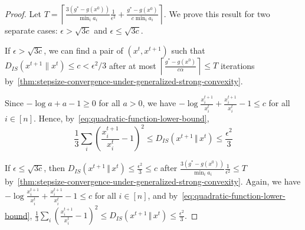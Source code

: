 \documentclass[format=acmsmall,authorversion]{acmart}
\newcommand{\BRC}[1]{{\textcolor{red}{BRC: #1}}}
\begin{document}
\begin{proof}
Let $T = \left\lceil\frac{3(g^* - g(x^0))}{\min_i a_i} \frac{1}{\epsilon^2} + \frac{g^* - g(x^0)}{c \min_i a_i}\right\rceil$. 
We prove this result for two separate cases: $\epsilon > \sqrt{3c}$ and $\epsilon \leq \sqrt{3c}$. 

If $\epsilon > \sqrt{3c}$, we can find a pair of $(x^t, x^{t + 1})$ such that $D_{IS}(x^{t+1}\|x^t) \leq c < \epsilon^2/3$ after at most $\left\lceil\frac{g^* - g(x^0)}{c \alpha} \right\rceil \leq T$ iterations by~\cref{thm:stepsize-convergence-under-generalized-strong-convexity}. 

Since $- \log{a} + a - 1 \geq 0$ for all $a > 0$, we have $- \log{\frac{x^{t+1}_i}{x^t_i}} + \frac{x^{t+1}_i}{x^t_i} - 1 \leq c$ for all $i \in [n]$. 
Hence, by~\cref{eq:quadratic-function-lower-bound},
$$\frac{1}{3}\sum_i \left( \frac{x^{t+1}_i}{x^t_i} - 1 \right)^2 \leq D_{IS}(x^{t+1}\,\Vert\,x^t) \leq \frac{\epsilon^2}{3}$$

If $\epsilon \leq \sqrt{3c}$, then  $D_{IS}(x^{t+1}\,\Vert\,x^t) \leq \frac{\epsilon^2}{3} \leq c$ after $\frac{3(g^* - g(x^0))}{\min_i a_i} \frac{1}{\epsilon^2} \leq T$ by~\cref{thm:stepsize-convergence-under-generalized-strong-convexity}. Again, we have $- \log{\frac{x^{t+1}_i}{x^t_i}} + \frac{x^{t+1}_i}{x^t_i} - 1 \leq c$ for all $i \in [n]$, and by~\cref{eq:quadratic-function-lower-bound}, $\frac{1}{3}\sum_i \left( \frac{x^{t+1}_i}{x^t_i} - 1 \right)^2 \leq D_{IS}(x^{t+1}\,\Vert\,x^t) \leq \frac{\epsilon^2}{3}$. 
\end{proof}


\end{document}
